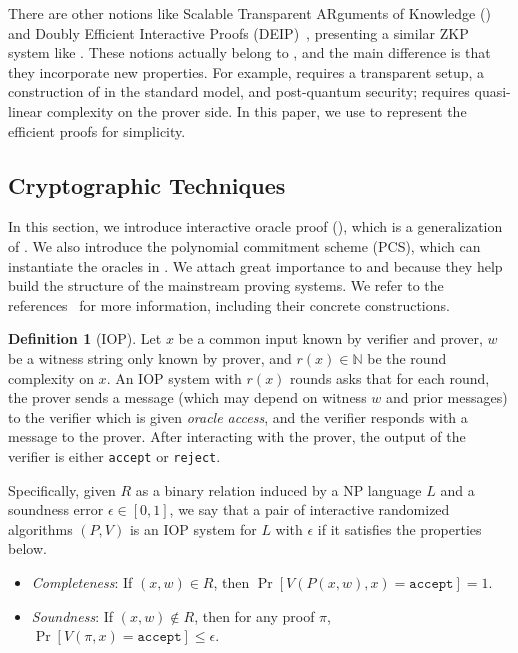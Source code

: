 \documentclass[letterpaper,twocolumn,10pt]{article}
\theoremstyle{definition}
\newtheorem{definition}{Definition}[section]
\newcommand{\zk}{\text{zk-SNARK}\xspace}
\newcommand{\IOP}{\text{IOP}\xspace}
\newcommand{\IP}{\text{IP}\xspace}
\newcommand{\PCS}{\text{PCS}\xspace}
\begin{document}
There are other notions like Scalable Transparent ARguments of Knowledge ()~\cite{ben2019scalable} and Doubly Efficient Interactive Proofs (DEIP)~\cite{wahby2018doubly}, presenting a similar ZKP system like \zk. These notions actually belong to \zk, and the main difference is that they incorporate new properties. For example,  requires a transparent setup, a construction of \zk in the standard model, and post-quantum security;  requires quasi-linear complexity on the prover side. In this paper, we use \zk to represent the efficient
 proofs for simplicity.

\subsection{Cryptographic Techniques}
\label{sec-tech}
In this section, we introduce interactive oracle proof (), which is a generalization of \IP. We also introduce the polynomial commitment scheme (PCS), which can instantiate the oracles in . We attach great importance to \IOP and \PCS because they help build the structure of the mainstream proving systems. 
We refer to the references~\cite{gabizon2019plonk} for more information, including their concrete constructions.

\begin{definition}[IOP]
	{Let $x$ be a common input known by verifier and prover, $w$ be a witness string only known by prover, and $r(x)\in\mathbb{N}$ be the round complexity on $x$. An IOP system with $r(x)$ rounds asks that for each round, the prover sends a message (which may depend on witness $w$ and prior messages) to the verifier which is given \textit{oracle access}, and the verifier responds with a message to the prover. After interacting with the prover, the output of the verifier is either \texttt{accept} or \texttt{reject}. }
	
	\par Specifically, given $R$ as a binary relation induced by a NP language $L$  and a soundness error $\epsilon \in [0,1]$, we say that a pair of interactive randomized algorithms $(P, V)$ is an IOP system for $L$ with $\epsilon$ if it satisfies the properties below.
	
	\begin{itemize}[noitemsep, topsep=2pt, partopsep=0pt,leftmargin=0.4cm]
		\item \textit{Completeness}: If $(x,w) \in R$, then $\Pr[V(P(x,w),x)= \texttt{accept}]=1$.
		\item \textit{Soundness}: If $(x,w) \notin R$, then for any proof $\pi$, $\Pr[V(\pi,x)= \texttt{accept}]\leq \epsilon$.
	\end{itemize}
\end{definition}
\end{document}
